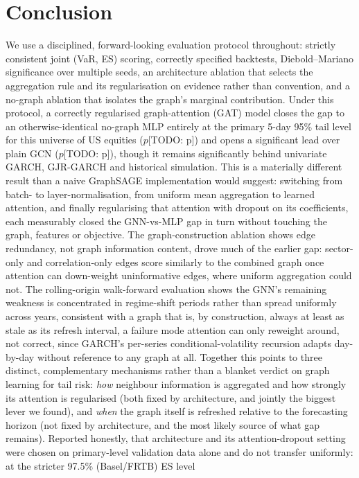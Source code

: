 \documentclass{llncs}
\newcommand{\todo}[1]{{\color{red}[TODO: #1]}}
\newcommand{\dmMlpP}{\todo{p}}
\newcommand{\dmGcnP}{\todo{p}}
\begin{document}
\section{Conclusion}
We use a disciplined, forward-looking evaluation protocol throughout:
strictly consistent joint (VaR, ES) scoring, correctly specified backtests,
Diebold--Mariano significance over multiple seeds, an architecture ablation
that selects the aggregation rule and its regularisation on evidence rather
than convention, and a no-graph ablation that isolates the graph's marginal
contribution. Under this protocol, a correctly regularised graph-attention
(GAT) model closes the gap to an
otherwise-identical no-graph MLP entirely at the primary 5-day 95\% tail level
for this universe of US equities ($p$\dmMlpP) and opens a significant lead
over plain GCN ($p$\dmGcnP), though it remains significantly behind
univariate GARCH, GJR-GARCH and historical simulation. This is a materially
different result than a naive GraphSAGE implementation would suggest:
switching from batch- to layer-normalisation, from uniform mean aggregation to
learned attention, and finally regularising that attention with dropout on its
coefficients, each measurably closed the GNN-vs-MLP gap in turn without
touching the graph, features or objective. The graph-construction ablation
shows edge redundancy, not graph information content, drove much of the
earlier gap: sector-only and correlation-only edges score similarly to the
combined graph once attention can down-weight uninformative edges, where
uniform aggregation could not. The rolling-origin walk-forward evaluation
shows the GNN's remaining weakness is concentrated in regime-shift periods
rather than spread uniformly across years, consistent with a graph that is,
by construction, always at least as stale as its refresh interval, a failure
mode attention can only reweight around, not correct, since GARCH's
per-series conditional-volatility recursion adapts day-by-day without
reference to any graph at all. Together this points to three distinct,
complementary mechanisms rather than a blanket verdict on graph learning for
tail risk: \emph{how} neighbour information is aggregated and how strongly its
attention is regularised (both fixed by architecture, and jointly the biggest
lever we found), and \emph{when} the graph itself is refreshed relative to the
forecasting horizon (not fixed by architecture, and the most likely source of
what gap remains). Reported honestly, that architecture and its
attention-dropout setting were chosen on primary-level validation data alone
and do not transfer uniformly: at the stricter 97.5\% (Basel/FRTB) ES level
\end{document}
